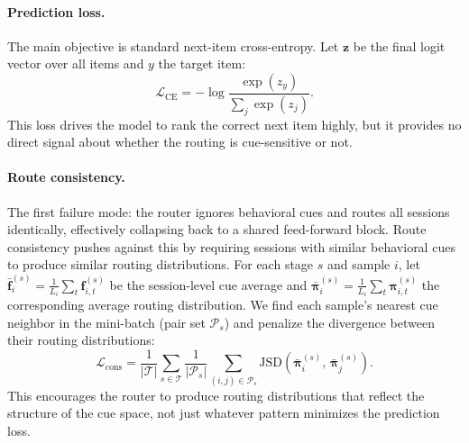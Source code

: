 \documentclass[sigconf,review,anonymous]{acmart}
\begin{document}
\paragraph{Prediction loss.}
The main objective is standard next-item cross-entropy. Let $\mathbf{z}$ be the final logit vector over all items and $y$ the target item:
\[
\mathcal{L}_{\mathrm{CE}} = -\log \frac{\exp(z_y)}{\sum_{j}\exp(z_j)}.
\]
This loss drives the model to rank the correct next item highly, but it provides no direct signal about whether the routing is cue-sensitive or not.

\paragraph{Route consistency.}
The first failure mode: the router ignores behavioral cues and routes all sessions identically, effectively collapsing back to a shared feed-forward block. Route consistency pushes against this by requiring sessions with similar behavioral cues to produce similar routing distributions. For each stage $s$ and sample $i$, let $\bar{\mathbf{f}}^{(s)}_i = \frac{1}{L_i}\sum_t\mathbf{f}^{(s)}_{i,t}$ be the session-level cue average and $\bar{\boldsymbol{\pi}}^{(s)}_i = \frac{1}{L_i}\sum_t\boldsymbol{\pi}^{(s)}_{i,t}$ the corresponding average routing distribution. We find each sample's nearest cue neighbor in the mini-batch (pair set $\mathcal{P}_s$) and penalize the divergence between their routing distributions:
\[
\mathcal{L}_{\mathrm{cons}}
=
\frac{1}{|\mathcal{T}|}
\sum_{s \in \mathcal{T}}
\frac{1}{|\mathcal{P}_s|}
\sum_{(i,j)\in \mathcal{P}_s}
\mathrm{JSD}\!\left(\bar{\boldsymbol{\pi}}^{(s)}_i,\,\bar{\boldsymbol{\pi}}^{(s)}_j\right).
\]
This encourages the router to produce routing distributions that reflect the structure of the cue space, not just whatever pattern minimizes the prediction loss.
\end{document}
